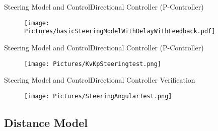 \begin{frame}{Steering Model and Control}{Directional Controller (P-Controller)}
    \begin{figure}[H]
    \centering
    \texttt{[image: Pictures/basicSteeringModelWithDelayWithFeedback.pdf]}
  \end{figure}
\end{frame}


\begin{frame}{Steering Model and Control}{Directional Controller (P-Controller)}
  \begin{figure}[H]
      \centering
      \texttt{[image: Pictures/KvKpSteeringtest.png]}
  \end{figure}
\end{frame}

\begin{frame}{Steering Model and Control}{Directional Controller Verification}
  \begin{figure}[H]
    \centering
    \texttt{[image: Pictures/SteeringAngularTest.png]}
  \end{figure}
\end{frame}


\subsection{Distance Model}

